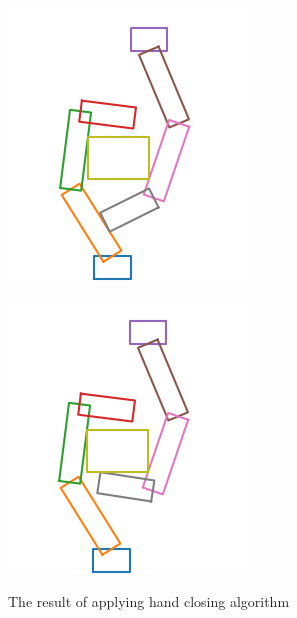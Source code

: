 \documentclass[a4paper,twoside,12pt,papersize, dvipdfmx]{iirthesis}
\begin{document}
{\begin{figure}[b]
\begin{minipage}{0.33\hsize}
\label{fig::planner::beforefc}
\end{minipage}\hfill
\begin{minipage}{0.33\hsize}
\includegraphics[width=0.9\hsize]{fig/3-new-planner/rec_FC_left_right.png}
\label{fig::planner::afterfclr}
\end{minipage}\hfill
\begin{minipage}{0.33\hsize}
\includegraphics[width=0.9\hsize]{fig/3-new-planner/rec_FC_right_left.png}
\label{fig::planner::afterfcrl}
\end{minipage}
\caption{The result of applying hand closing algorithm}\label{fig::planner::fc}
\end{figure}

}
\end{document}
